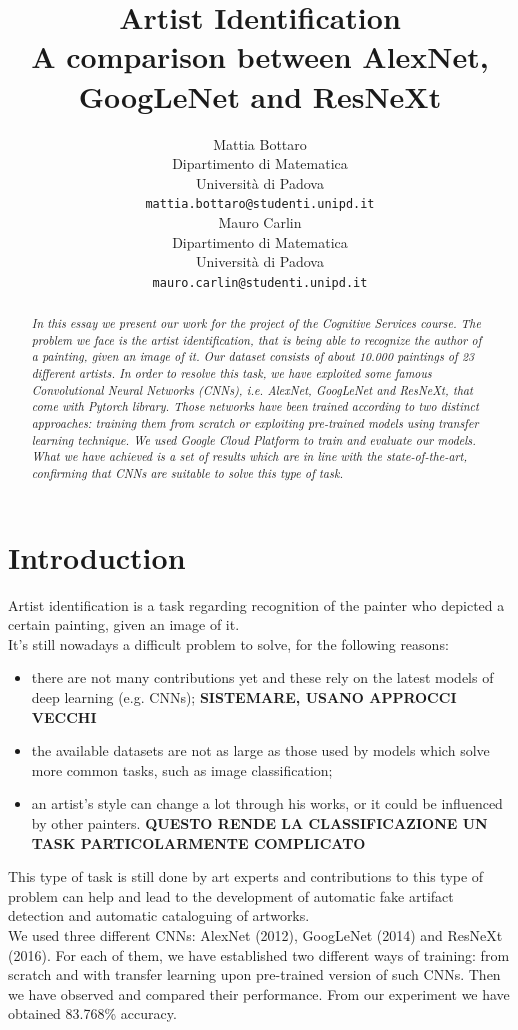 \documentclass{article}
\title{Artist Identification	\\  A comparison between AlexNet, GoogLeNet and ResNeXt}
\author{
  Mattia Bottaro \\
  Dipartimento  di Matematica\\
  Università di Padova \\
  \texttt{mattia.bottaro@studenti.unipd.it} \\
   \And
  Mauro Carlin \\
Dipartimento  di Matematica\\
Università di Padova \\
\texttt{mauro.carlin@studenti.unipd.it} \\
}
\begin{document}
\maketitle

\begin{abstract}
	\textit{In this essay we present our work for the project of the Cognitive Services course.
	The problem we face is the artist identification, that is being able to recognize the author of a painting, given an image of it. Our dataset consists of about 10.000 paintings of 23 different artists.
	In order to resolve this task, we have exploited some famous Convolutional Neural Networks (CNNs), i.e. AlexNet, GoogLeNet and ResNeXt, that come with \textit{Pytorch} library. Those networks have been trained according to two distinct approaches: training them from scratch or exploiting pre-trained models using transfer learning technique. We used \textit{Google Cloud Platform} to train and evaluate our models.\\
	What we have achieved is a set of results which are in line with the state-of-the-art, confirming that CNNs are suitable to solve this type of task.}
\end{abstract}




\section{Introduction}
Artist identification is a task regarding recognition of the painter who depicted a certain painting, given an image of it.\\
It's still nowadays a difficult problem to solve, for the following reasons:
\begin{itemize}
	\item there are not many contributions yet and these rely on the latest models of deep learning (e.g. CNNs);  \textbf{SISTEMARE, USANO APPROCCI VECCHI}
	\item the available datasets are not as large as those used by models which solve more common tasks, such as image classification;
	\item an artist's style can change a lot through his works, or it could be influenced by other painters. \textbf{QUESTO RENDE LA CLASSIFICAZIONE UN TASK PARTICOLARMENTE COMPLICATO}
\end{itemize}
This type of task is still done by art experts and contributions to this type of problem can help and lead to the development of automatic fake artifact detection and automatic cataloguing of artworks.\\
We used three different CNNs: AlexNet (2012), GoogLeNet (2014) and ResNeXt (2016). For each of them, we have established two different ways of training: from scratch and with transfer learning  upon pre-trained version of such CNNs. Then we have observed and compared their performance. From our experiment we have obtained 83.768\% accuracy.\\
\end{document}
